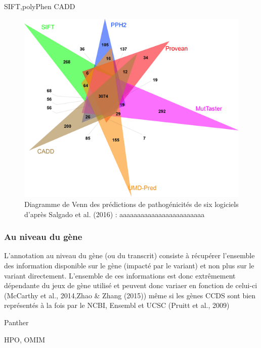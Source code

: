 \documentclass[12pt,twoside]{reedthesis}
\theoremstyle{definition}
\theoremstyle{definition}
\theoremstyle{remark}
\begin{document}
  SIFT,polyPhen CADD
  
  \begin{figure}
  
  {\centering \includegraphics[scale=.7]{figure/venn_Diag_patho_pred} 
  
  }
  
  \caption[Diagramme de Venn des prédictions de pathogénicités de six logiciels d’après Salgado et al. (2016)]{Diagramme de Venn des prédictions de pathogénicités de six logiciels d’après Salgado et al. (2016) : aaaaaaaaaaaaaaaaaaaaaaaa}\label{fig:vennpred}
  \end{figure}
  
  \subsubsection{Au niveau du gène}\label{au-niveau-du-gene}
  
  L'annotation au niveau du gène (ou du transcrit) consiste à récupérer
  l'ensemble des information disponible sur le gène (impacté par le
  variant) et non plus sur le variant directement. L'ensemble de ces
  informations est donc extrêmement dépendante du jeux de gène utilisé et
  peuvent donc variaer en fonction de celui-ci (McCarthy et al., 2014,Zhao
  \& Zhang (2015)) même si les gènes CCDS sont bien représentés à la fois
  par le NCBI, Ensembl et UCSC (Pruitt et al., 2009)
  
  Panther
  
  HPO, OMIM
  
\end{document}

